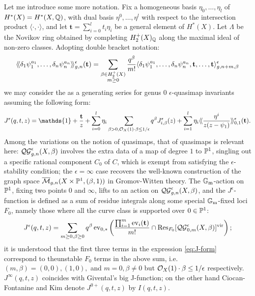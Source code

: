 Let me introduce some more notation. Fix a homogeneous basis $\eta_0,\ldots,\eta_l$ of $H^*(X)=H^*(X,\mathbb{Q})$, with dual basis $\eta^0,\ldots,\eta^l$ with respect to the intersection product $\langle\cdot,\cdot\rangle$, and let $\mathbf{t}=\sum_{i=0}^lt_i\eta_i$ be a general element of $H^*(X)$. Let $\Lambda$ be the Novikov ring obtained by completing $ H_2^+(X)_{\mathbb{Q}}$ along the maximal ideal of non-zero classes. Adopting double bracket notation:
\[\langle\!\langle\delta_1\psi_1^{a_1},\ldots,\delta_n\psi_n^{a_n}\rangle\!\rangle^\epsilon_{g,n}(\mathbf{t})=\sum_{\substack{\beta\in H_2^+(X) \\ m\geq 0}}\frac{q^\beta}{m!}\langle \delta_1\psi_1^{a_1},\ldots,\delta_n\psi_n^{a_n},\mathbf t,\ldots,\mathbf t\rangle^{\epsilon}_{g,n+m,\beta} \]
we may consider the  as a generating series for genus $0$ $\epsilon$-quasimap invariants assuming the following form:
\begin{equation}\label{eq:J-form} J^\epsilon(q,t,z)=\mathds{1}+\frac{\mathbf{t}}{z}+\sum_{i=0}^l\eta_i\sum_{\beta> 0,\OO_X(1)\cdot\beta\leq 1/\epsilon}q^\beta J^\epsilon_{i,\beta}(z)+\sum_{i=1}^l\eta_i\lala\frac{\eta^i}{z(z-\psi_1)}\rara^\epsilon_{0,1}(\mathbf{t}).\end{equation}
Among the variations on the notion of quasimaps, that of  quasimaps is relevant here:
$\mathcal{QG}^{\epsilon}_{g,n}(X,\beta)$ involves the extra data of a map of degree $1$ to $\mathbb P^1$, singling out a specific rational component $C_0$ of $C$, which is exempt from satisfying the $\epsilon$-stability condition; the $\epsilon=\infty$ case recovers the well-known construction of the graph space $\overline{\mathcal{M}}_{g,n}(X\times\mathbb P^1,(\beta,1))$ in Gromov-Witten theory. The $\mathbb{G}_{\text{m}}$-action on $\mathbb P^1$, fixing two points $0$ and $\infty$, lifts to an action on $\mathcal{QG}^{\epsilon}_{g,n}(X,\beta)$, and the $J^\epsilon$-function is defined as a sum of residue integrals along some special $\mathbb{G}_{\text{m}}$-fixed loci $F_0$, namely those where all the curve class is supported over $0\in\mathbb P^1$:
\[J^\epsilon(q,t,z)=\sum_{m\geq0,\beta\geq0}q^\beta \operatorname{ev}_{0,*}\left(\frac{\prod_{i=1}^m \operatorname{ev}_i(\mathbf{t})}{m!}\cap\operatorname{Res}_{F_0}[\mathcal{QG}^{\epsilon}_{0,m}(X,\beta)]^{\mathrm{vir}}\right);\]
it is understood that the first three terms in the expression \eqref{eq:J-form} correspond to theunstable $F_0$ terms in the above sum, i.e. $(m,\beta)=(0,0), (1,0),$ and $m=0,\beta\neq 0$ but $\mathcal{O}_X(1)\cdot\beta\leq 1/\epsilon$ respectively. $J^\infty(q,t,z)$ coincides with Givental's big J-function; on the other hand Ciocan-Fontanine and Kim denote $J^{0+}(q,t,z)$ by $I(q,t,z)$.

